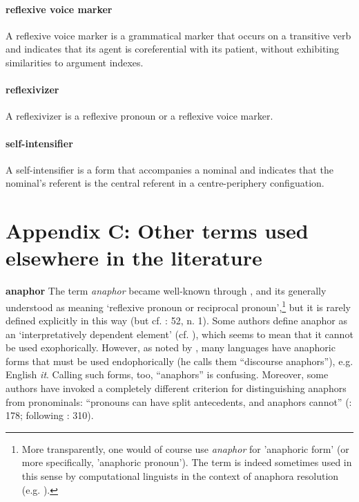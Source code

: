 \documentclass[output=paper]{langscibook}
\begin{document}
\paragraph*{reflexive voice marker} A reflexive voice marker is a grammatical marker that occurs on a transitive verb and indicates that its agent is coreferential with its patient, without exhibiting similarities to argument indexes.

\paragraph*{reflexivizer} A reflexivizer is a reflexive pronoun or a reflexive voice marker.

\paragraph*{self-intensifier} A self-intensifier is a form that accompanies a nominal and indicates that the nominal’s referent is the central referent in a centre-periphery configuation.


\section*{Appendix C: Other terms used elsewhere in the literature}\label{sec:Haspelmath:c}
\textbf{anaphor}
The term \textit{anaphor} became well-known through \citet{Chomsky1981}, and its generally understood as meaning ‘reflexive pronoun or reciprocal pronoun’,\footnote{ {More transparently, one would of course use} {\textit{anaphor}} {for ’anaphoric form’ (or more specifically, ’anaphoric pronoun’). The term is indeed sometimes used in this sense by computational linguists in the context of anaphora resolution (e.g. \citealt{Mitkov2002}).} } but it is rarely defined explicitly in this way (but cf. \citealt{Forker2014}: 52, n. 1). Some authors define anaphor as an ‘interpretatively dependent element’ (cf. \citealt[82]{Reuland2018}), which seems to mean that it cannot be used exophorically. However, as noted by \citet{Kiparsky2002,Kiparsky2012}, many languages have anaphoric forms that must be used endophorically (he calls them “discourse anaphors”), e.g. English \textit{it}. Calling such forms, too, “anaphors” is confusing. Moreover, some authors have invoked a completely different criterion for distinguishing anaphors from pronominals: “pronouns can have split antecedents, and anaphors cannot” (\citealt{Volkova2017}: 178; following \citealt{Giorgi1984}: 310).
\end{document}
